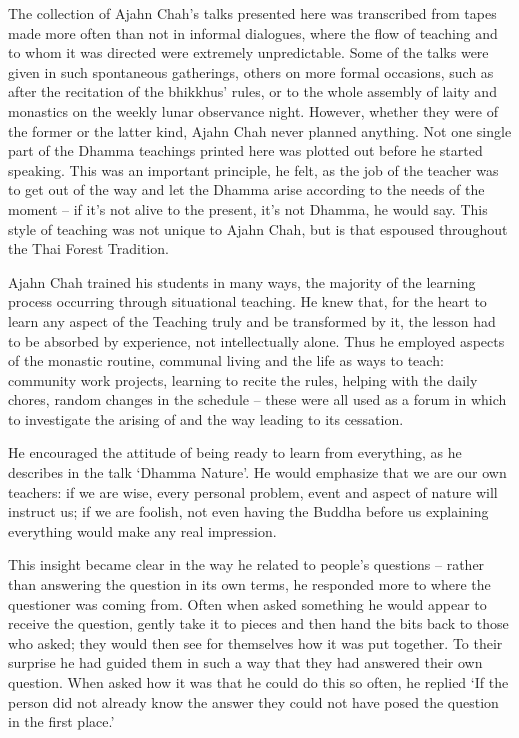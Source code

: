 The collection of Ajahn Chah's talks presented here was transcribed from tapes made more often than not in informal dialogues, where the flow of teaching and to whom it was directed were extremely unpredictable. Some of the talks were given in such spontaneous gatherings, others on more formal occasions, such as after the recitation of the bhikkhus' rules, or to the whole assembly of laity and monastics on the weekly lunar observance night. However, whether they were of the former or the latter kind, Ajahn Chah never planned anything. Not one single part of the Dhamma teachings printed here was plotted out before he started speaking. This was an important principle, he felt, as the job of the teacher was to get out of the way and let the Dhamma arise according to the needs of the moment -- if it's not alive to the present, it's not Dhamma, he would say. This style of teaching was not unique to Ajahn Chah, but is that espoused throughout the Thai Forest Tradition.

Ajahn Chah trained his students in many ways, the majority of the learning process occurring through situational teaching. He knew that, for the heart to learn any aspect of the Teaching truly and be transformed by it, the lesson had to be absorbed by experience, not intellectually alone. Thus he employed aspects of the monastic routine, communal living and the  life as ways to teach: community work projects, learning to recite the rules, helping with the daily chores, random changes in the schedule -- these were all used as a forum in which to investigate the arising of  and the way leading to its cessation. 

He encouraged the attitude of being ready to learn from everything, as he describes in the talk `Dhamma Nature'. He would emphasize that we are our own teachers: if we are wise, every personal problem, event and aspect of nature will instruct us; if we are foolish, not even having the Buddha before us explaining everything would make any real impression. 

This insight became clear in the way he related to people's questions -- rather than answering the question in its own terms, he responded more to where the questioner was coming from. Often when asked something he would appear to receive the question, gently take it to pieces and then hand the bits back to those who asked; they would then see for themselves how it was put together. To their surprise he had guided them in such a way that they had answered their own question. When asked how it was that he could do this so often, he replied `If the person did not already know the answer they could not have posed the question in the first place.' 


